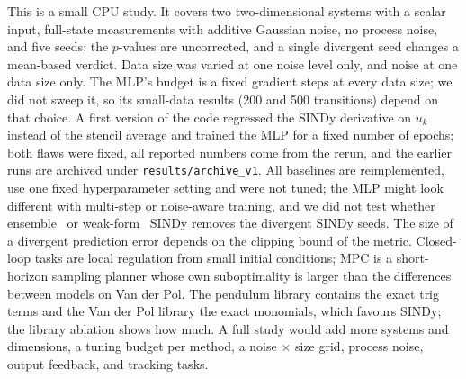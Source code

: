 This is a small CPU study. It covers two two-dimensional systems with a scalar input, full-state measurements with additive Gaussian noise, no process noise, and five seeds; the $p$-values are uncorrected, and a single divergent seed changes a mean-based verdict. Data size was varied at one noise level only, and noise at one data size only. The MLP's budget is a fixed  gradient steps at every data size; we did not sweep it, so its small-data results (200 and 500 transitions) depend on that choice. A first version of the code regressed the SINDy derivative on $u_k$ instead of the stencil average and trained the MLP for a fixed number of epochs; both flaws were fixed, all reported numbers come from the rerun, and the earlier runs are archived under \texttt{results/archive\_v1}. All baselines are reimplemented, use one fixed hyperparameter setting and were not tuned; the MLP might look different with multi-step or noise-aware training, and we did not test whether ensemble~\cite{fasel2022ensemble} or weak-form~\cite{messenger2020weak} SINDy removes the divergent SINDy seeds. The size of a divergent prediction error depends on the clipping bound of the metric. Closed-loop tasks are local regulation from small initial conditions; MPC is a short-horizon sampling planner whose own suboptimality is larger than the differences between models on Van der Pol. The pendulum library contains the exact trig terms and the Van der Pol library the exact monomials, which favours SINDy; the library ablation shows how much. A full study would add more systems and dimensions, a tuning budget per method, a noise $\times$ size grid, process noise, output feedback, and tracking tasks.
